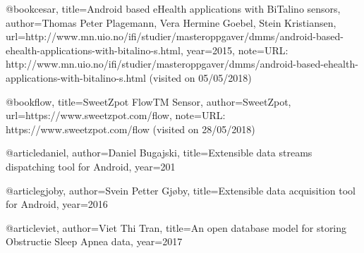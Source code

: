 @book{cesar,
  title={Android based eHealth applications with BiTalino sensors},
  author={Thomas Peter Plagemann, Vera Hermine Goebel, Stein Kristiansen},
  url={http://www.mn.uio.no/ifi/studier/masteroppgaver/dmms/android-based-ehealth-applications-with-bitalino-s.html},
  year={2015},
  note={URL: http://www.mn.uio.no/ifi/studier/masteroppgaver/dmms/android-based-ehealth-applications-with-bitalino-s.html (visited on 05/05/2018)}
}

@book{flow,
  title={SweetZpot FlowTM Sensor},
  author={SweetZpot},
  url={https://www.sweetzpot.com/flow},
  note={URL: https://www.sweetzpot.com/flow (visited on 28/05/2018)}
}



@article{daniel,
    author={Daniel Bugajski},
    title={Extensible data streams dispatching tool for Android},
    year=201
}

@article{gjoby,
    author={Svein Petter Gjøby},
    title={Extensible data acquisition tool for Android},
    year=2016
}

@article{viet,
    author={Viet Thi Tran},
    title={An open database model for storing Obstructie Sleep Apnea data},
    year=2017
}
